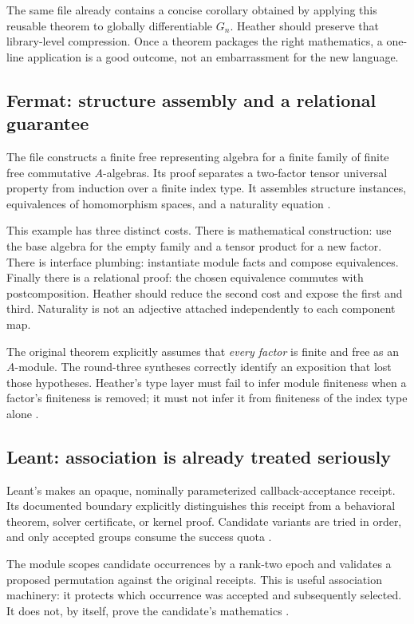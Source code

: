\documentclass[11pt,letterpaper]{article}
\newcommand{\code}[1]{\texttt{\detokenize{#1}}}
\theoremstyle{definition}\newtheorem{definition}[theorem]{Definition}
\theoremstyle{remark}\newtheorem{remark}[theorem]{Remark}
\begin{document}
The same file already contains a concise corollary obtained by applying this
reusable theorem to globally differentiable $G_n$. Heather should preserve that
library-level compression. Once a theorem packages the right mathematics,
a one-line application is a good outcome, not an embarrassment for the new
language.

\subsection{Fermat: structure assembly and a relational guarantee}
The file  constructs a finite
free representing algebra for a finite family of finite free commutative
$A$-algebras. Its proof separates a two-factor tensor universal property from
induction over a finite index type. It assembles structure instances,
equivalences of homomorphism spaces, and a naturality equation
\cite{tensor}.

This example has three distinct costs. There is mathematical construction:
use the base algebra for the empty family and a tensor product for a new factor.
There is interface plumbing: instantiate module facts and compose equivalences.
Finally there is a relational proof: the chosen equivalence commutes with
postcomposition. Heather should reduce the second cost and expose the first
and third. Naturality is not an adjective attached independently to each
component map.

The original theorem explicitly assumes that \emph{every factor} is finite and
free as an $A$-module. The round-three syntheses correctly identify an exposition
that lost those hypotheses. Heather's type layer must fail to infer module
finiteness when a factor's finiteness is removed; it must not infer it from
finiteness of the index type alone \cite{tensor,round3a,round3b}.

\subsection{Leant: association is already treated seriously}
Leant's  makes \code{Verified} an opaque,
nominally parameterized callback-acceptance receipt. Its documented boundary
explicitly distinguishes this receipt from a behavioral theorem, solver
certificate, or kernel proof. Candidate variants are tried in order, and only
accepted groups consume the success quota \cite{leant-verification}.

The  module scopes candidate occurrences by a
rank-two epoch and validates a proposed permutation against the original
receipts. This is useful association machinery: it protects which occurrence
was accepted and subsequently selected. It does not, by itself, prove the
candidate's mathematics \cite{leant-post}.
\end{document}
